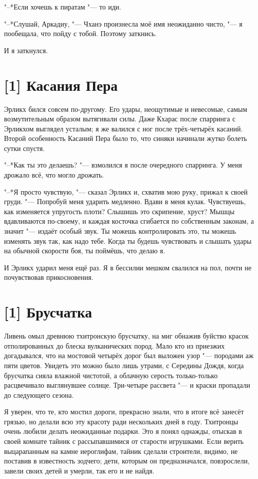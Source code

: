 "--*Если хочешь к пиратам "--- то иди.

"--*Слушай, Аркадиу, "--- Чханэ произнесла моё имя неожиданно чисто, "--- я пообещала, что пойду с тобой.
Поэтому заткнись.

И я заткнулся.

\section{[1] Касания Пера}

Эрликх бился совсем по-другому.
Его удары, неощутимые и невесомые, самым возмутительным образом вытягивали силы.
Даже Кхарас после спарринга с Эрликхом выглядел усталым;
я же валился с ног после трёх-четырёх касаний.
Второй особенность Касаний Пера было то, что синяки начинали жутко болеть сутки спустя.

"--*Как ты это делаешь? "--- взмолился я после очередного спарринга.
У меня дрожало всё, что могло дрожать.

"--*Я просто чувствую, "--- сказал Эрликх и, схватив мою руку, прижал к своей груди.
"--- Попробуй меня ударить медленно.
Вдави в меня кулак.
Чувствуешь, как изменяется упругость плоти?
Слышишь это скрипение, хруст?
Мышцы вдавливаются по-своему, и каждая косточка сгибается по собственным законам, а значит "--- издаёт особый звук.
Ты можешь контролировать это, ты можешь изменять звук так, как надо тебе.
Когда ты будешь чувствовать и слышать удары на обычной скорости боя, ты поймёшь, что делаю я.

И Эрликх ударил меня ещё раз.
Я в бессилии мешком свалился на пол, почти не почувствовав прикосновения.

\section{[1] Брусчатка}

Ливень омыл древнюю тхитронскую брусчатку, на миг обнажив буйство красок отполированных до блеска вулканических пород.
Мало кто из приезжих догадывался, что на мостовой четырёх дорог был выложен узор "--- породами аж пяти цветов.
Увидеть это можно было лишь утрами, с Середины Дождя, когда брусчатка сияла влажной чистотой, а облачную серость только-только расцвечивало выглянувшее солнце.
Три-четыре рассвета "--- и краски пропадали до следующего сезона.

Я уверен, что те, кто мостил дороги, прекрасно знали, что в итоге всё занесёт грязью, но делали всю эту красоту ради нескольких дней в году.
Тхитронцы очень любили делать неожиданные подарки.
Это я понял однажды, отыскав в своей комнате тайник с рассыпавшимися от старости игрушками.
Если верить выцарапанным на камне иероглифам, тайник сделали строители, видимо, не поставив в известность зодчего;
дети, которым он предназначался, повзрослели, завели своих детей и умерли, так его и не найдя\footnotemark.

